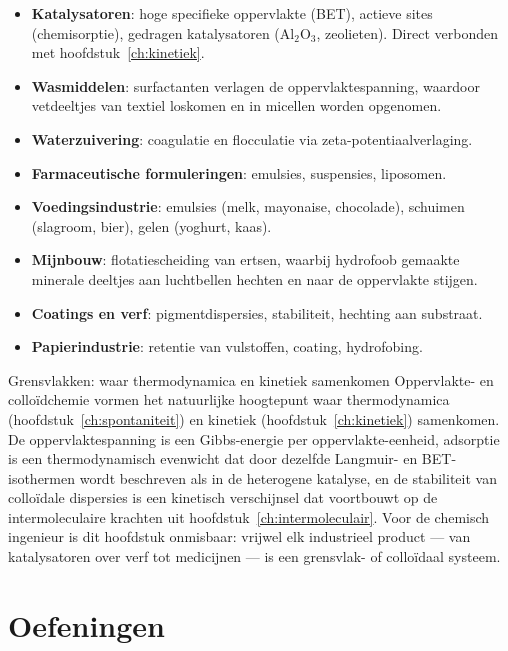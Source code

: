 \begin{itemize}
\item \textbf{Katalysatoren}: hoge specifieke oppervlakte (BET), actieve sites (chemisorptie), gedragen katalysatoren ($\mathrm{Al_2O_3}$, zeolieten). Direct verbonden met hoofdstuk~\ref{ch:kinetiek}.
\item \textbf{Wasmiddelen}: surfactanten verlagen de oppervlaktespanning, waardoor vetdeeltjes van textiel loskomen en in micellen worden opgenomen.
\item \textbf{Waterzuivering}: coagulatie en flocculatie via zeta-potentiaalverlaging.
\item \textbf{Farmaceutische formuleringen}: emulsies, suspensies, liposomen.
\item \textbf{Voedingsindustrie}: emulsies (melk, mayonaise, chocolade), schuimen (slagroom, bier), gelen (yoghurt, kaas).
\item \textbf{Mijnbouw}: flotatiescheiding van ertsen, waarbij hydrofoob gemaakte minerale deeltjes aan luchtbellen hechten en naar de oppervlakte stijgen.
\item \textbf{Coatings en verf}: pigmentdispersies, stabiliteit, hechting aan substraat.
\item \textbf{Papierindustrie}: retentie van vulstoffen, coating, hydrofobing.
\end{itemize}

\begin{besluit}{Grensvlakken: waar thermodynamica en kinetiek samenkomen}
Oppervlakte- en collo\"idchemie vormen het natuurlijke hoogtepunt waar thermodynamica (hoofdstuk~\ref{ch:spontaniteit}) en kinetiek (hoofdstuk~\ref{ch:kinetiek}) samenkomen. De oppervlaktespanning is een Gibbs-energie per oppervlakte-eenheid, adsorptie is een thermodynamisch evenwicht dat door dezelfde Langmuir- en BET-isothermen wordt beschreven als in de heterogene katalyse, en de stabiliteit van collo\"idale dispersies is een kinetisch verschijnsel dat voortbouwt op de intermoleculaire krachten uit hoofdstuk~\ref{ch:intermoleculair}. Voor de chemisch ingenieur is dit hoofdstuk onmisbaar: vrijwel elk industrieel product --- van katalysatoren over verf tot medicijnen --- is een grensvlak- of collo\"idaal systeem.
\end{besluit}

\newpage
\section{Oefeningen}


